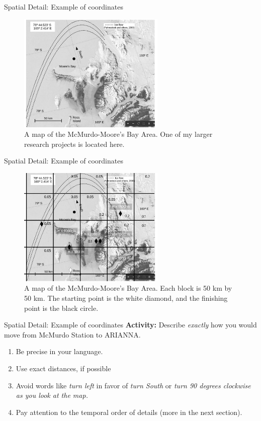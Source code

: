 \documentclass{beamer}
\begin{document}
\begin{frame}{Spatial Detail: Example of coordinates}
\begin{figure}[ht]
\centering
\includegraphics[width=7cm]{figures/NavigationMazePlain.pdf}
\caption{\label{fig:maze1} A map of the McMurdo-Moore's Bay Area.  One of my larger research projects is located here.}
\end{figure}
\end{frame}

\begin{frame}{Spatial Detail: Example of coordinates}
\begin{figure}[ht]
\centering
\includegraphics[width=7cm]{figures/NavigationMaze.pdf}
\caption{\label{fig:maze2} A map of the McMurdo-Moore's Bay Area.  Each block is 50 km by 50 km.  The starting point is the white diamond, and the finishing point is the black circle.}
\end{figure}
\end{frame}

\begin{frame}{Spatial Detail: Example of coordinates}
\textbf{Activity:} Describe \textit{exactly} how you would move from McMurdo Station to ARIANNA.
\begin{enumerate}
\item Be precise in your language.
\item Use exact distances, if possible
\item Avoid words like \textit{turn left} in favor of \textit{turn South} or \textit{turn 90 degrees clockwise as you look at the map.}
\item Pay attention to the temporal order of details (more in the next section).
\end{enumerate}
\end{frame}
\end{document}
